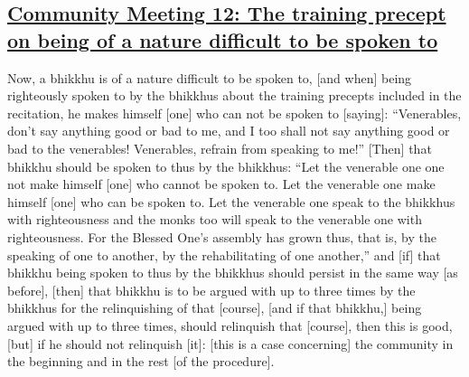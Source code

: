 \subsection*{\hyperref[sd12]{Community Meeting 12: The training precept on being of a nature difficult to be spoken to}}
\label{comm12}

Now, a bhikkhu is of a nature difficult to be spoken to, [and when] being righteously spoken to by the bhikkhus about the training precepts included in the recitation, he makes himself [one] who can not be spoken to [saying]: ``Venerables, don't say anything good or bad to me, and I too shall not say anything good or bad to the venerables! Venerables, refrain from speaking to me!'' [Then] that bhikkhu should be spoken to thus by the bhikkhus: ``Let the venerable one one not make himself [one] who cannot be spoken to. Let the venerable one make himself [one] who can be spoken to. Let the venerable one speak to the bhikkhus with righteousness and the monks too will speak to the venerable one with righteousness. For the Blessed One's assembly has grown thus, that is, by the speaking of one to another, by the rehabilitating of one another,'' and [if] that bhikkhu being spoken to thus by the bhikkhus should persist in the same way [as before], [then] that bhikkhu is to be argued with up to three times by the bhikkhus for the relinquishing of that [course], [and if that bhikkhu,] being argued with up to three times, should relinquish that [course], then this is good, [but] if he should not relinquish [it]: [this is a case concerning] the community in the beginning and in the rest [of the procedure].



